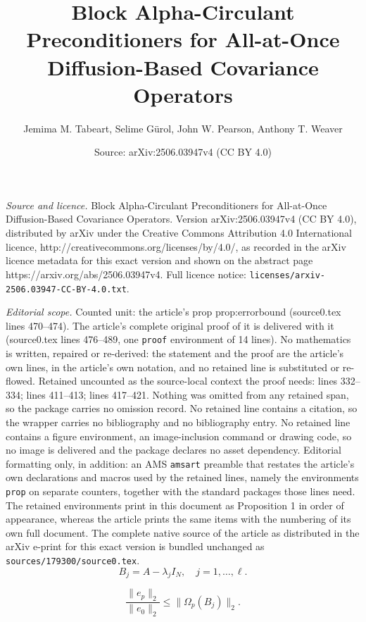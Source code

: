 \documentclass[10pt,a4paper]{amsart}
\title{Block {Alpha-}Circulant Preconditioners for All-at-Once Diffusion-Based Covariance Operators}
\author{Jemima M. Tabeart, Selime G\"urol, John W. Pearson, Anthony T. Weaver}
\date{Source: arXiv:2506.03947v4 (CC BY 4.0)}
\newcommand{\poly}{\Omega}
\newcommand{\sizeA}{N}
\begin{document}
\maketitle

\noindent\emph{Source and licence.} Block {Alpha-}Circulant Preconditioners for All-at-Once Diffusion-Based Covariance Operators. Version arXiv:2506.03947v4 (CC BY 4.0), distributed by arXiv under the Creative Commons Attribution 4.0 International licence, http://creativecommons.org/licenses/by/4.0/, as recorded in the arXiv licence metadata for this exact version and shown on the abstract page https://arxiv.org/abs/2506.03947v4. Full licence notice: \texttt{licenses/arxiv-2506.03947-CC-BY-4.0.txt}.\par\smallskip

\noindent\textit{Editorial scope.} Counted unit: the article's prop prop:errorbound (source0.tex lines 470--474). The article's complete original proof of it is delivered with it (source0.tex lines 476--489, one \texttt{proof} environment of 14 lines). No mathematics is written, repaired or re-derived: the statement and the proof are the article's own lines, in the article's own notation, and no retained line is substituted or re-flowed.  Retained uncounted as the source-local context the proof needs: lines 332--334; lines 411--413; lines 417--421.  Nothing was omitted from any retained span, so the package carries no omission record.  No retained line contains a citation, so the wrapper carries no bibliography and no bibliography entry.  No retained line contains a figure environment, an image-inclusion command or drawing code, so no image is delivered and the package declares no asset dependency.  Editorial formatting only, in addition: an AMS \texttt{amsart} preamble that restates the article's own declarations and macros used by the retained lines, namely the environments \texttt{prop} on separate counters, together with the standard packages those lines need.  The retained environments print in this document as Proposition 1 in order of appearance, whereas the article prints the same items with the numbering of its own full document.  The complete native source of the article as distributed in the arXiv e-print for this exact version is bundled unchanged as \texttt{sources/179300/source0.tex}.
		\begin{equation}\label{eq:B definition}
			B_j = {A} - \lambda_j I_\sizeA, \quad {j = 1, \ldots, \ell}.
		\end{equation}

		\begin{equation}\label{ep_error}
			\frac{\| {e}_p \|_2}{\| {e}_0 \|_2} \le \|  \poly_p(B_j) \|_2.
		\end{equation}
\end{document}

